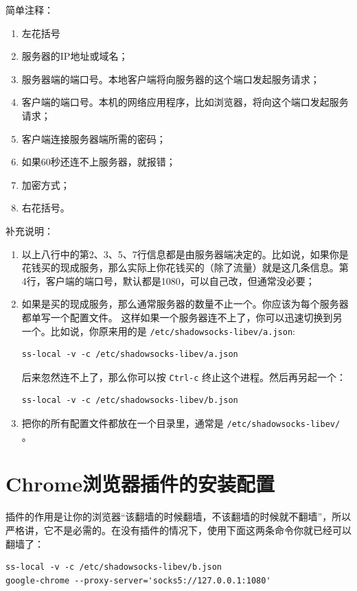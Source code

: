 \documentclass{wx672ctexart}
\begin{document}
简单注释：
\begin{enumerate}
\item 左花括号
\item 服务器的IP地址或域名；
\item 服务器端的端口号。本地客户端将向服务器的这个端口发起服务请求；
\item 客户端的端口号。本机的网络应用程序，比如浏览器，将向这个端口发起服务请求；
\item 客户端连接服务器端所需的密码；
\item 如果60秒还连不上服务器，就报错；
\item 加密方式；
\item 右花括号。
\end{enumerate}

补充说明：
\begin{enumerate}
\item 以上八行中的第2、3、5、7行信息都是由服务器端决定的。比如说，如果你是花钱买的现成服务，那么实际上你花钱买的（除了流量）就是这几条信息。第4行，客户端的端口号，默认都是1080，可以自己改，但通常没必要；
\item 如果是买的现成服务，那么通常服务器的数量不止一个。你应该为每个服务器都单写一个配置文件。
这样如果一个服务器连不上了，你可以迅速切换到另一个。比如说，你原来用的是
\texttt{/etc/shadowsocks-libev/a.json}:
\begin{verbatim}
ss-local -v -c /etc/shadowsocks-libev/a.json
\end{verbatim}

后来忽然连不上了，那么你可以按 \texttt{Ctrl-c} 终止这个进程。然后再另起一个：
\begin{verbatim}
ss-local -v -c /etc/shadowsocks-libev/b.json
\end{verbatim}
\item 把你的所有配置文件都放在一个目录里，通常是 \texttt{/etc/shadowsocks-libev/} 。
\end{enumerate}

\section{Chrome浏览器插件的安装配置}
\label{sec:org1d21325}
插件的作用是让你的浏览器“该翻墙的时候翻墙，不该翻墙的时候就不翻墙”，所以严格讲，它不是必需的。在没有插件的情况下，使用下面这两条命令你就已经可以翻墙了：
\begin{verbatim}
ss-local -v -c /etc/shadowsocks-libev/b.json
google-chrome --proxy-server='socks5://127.0.0.1:1080'
\end{verbatim}
\end{document}
